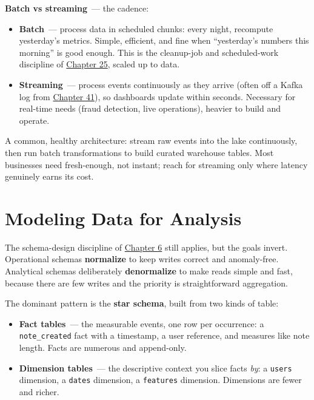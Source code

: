 \noindent{}\textbf{Batch vs streaming}~--- the cadence:

\begin{itemize}
\tightlist
\item
  \textbf{Batch}~--- process data in scheduled chunks: every night, recompute yesterday's metrics. Simple, efficient, and fine when ``yesterday's numbers this morning'' is good enough. This is the cleanup-job and scheduled-work discipline of \hyperref[ch:25-process-management]{Chapter 25}, scaled up to data.
\item
  \textbf{Streaming}~--- process events continuously as they arrive (often off a Kafka log from \hyperref[ch:41-event-driven-architecture]{Chapter 41}), so dashboards update within seconds. Necessary for real-time needs (fraud detection, live operations), heavier to build and operate.
\end{itemize}

\noindent{}A common, healthy architecture: stream raw events into the lake continuously, then run batch transformations to build curated warehouse tables. Most businesses need fresh-enough, not instant; reach for streaming only where latency genuinely earns its cost.

\setcounter{section}{3}
\section{Modeling Data for Analysis}\label{42-data-analytics-plane:424-modeling-data-for-analysis}

The schema-design discipline of \hyperref[ch:06-local-dependencies]{Chapter 6} still applies, but the goals invert. Operational schemas \textbf{normalize} to keep writes correct and anomaly-free. Analytical schemas deliberately \textbf{denormalize} to make reads simple and fast, because there are few writes and the priority is straightforward aggregation.

The dominant pattern is the \textbf{star schema}, built from two kinds of table:

\begin{itemize}
\tightlist
\item
  \textbf{Fact tables}~--- the measurable events, one row per occurrence: a \texttt{note\_created} fact with a timestamp, a user reference, and measures like note length. Facts are numerous and append-only.
\item
  \textbf{Dimension tables}~--- the descriptive context you slice facts \emph{by}: a \texttt{users} dimension, a \texttt{dates} dimension, a \texttt{features} dimension. Dimensions are fewer and richer.
\end{itemize}

